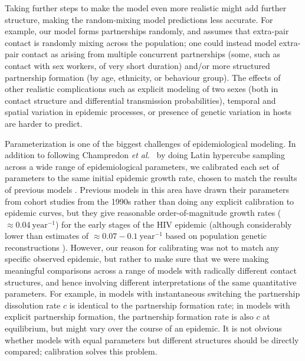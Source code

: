 \documentclass[10pt,letterpaper]{article}
\newcommand{\etal}{\textit{et al.}}
\begin{document}
Taking further steps to make the model even more realistic
might add further structure,
making the random-mixing model predictions less accurate. For
example, our model forms partnerships randomly, and assumes that
extra-pair contact is randomly mixing across the population;
one could instead model extra-pair contact as arising from
multiple concurrent partnerships (some, such as contact with sex
workers, of very short duration) and/or more structured partnership
formation (by age, ethnicity, or behaviour group). The effects of
other realistic complications such as explicit modeling of two
sexes (both in contact structure and differential transmission
probabilities), temporal and spatial variation in epidemic processes,
or presence of genetic variation in hosts are harder to predict.

Parameterization is one of the biggest challenges of epidemiological
modeling. In addition to following Champredon \etal\ \cite{champredon_hiv_2013} 
by doing Latin hypercube
sampling across a wide range of epidemiological parameters, we 
calibrated each set of parameters to the same initial epidemic
growth rate, chosen to match the results of previous models
\cite{shirreff_transmission_2011}.  Previous models 
in this area have drawn their
parameters from cohort studies from the 1990s
\cite{wawer2005rates,hollingsworth_hiv1_2008}
rather than doing any explicit calibration to epidemic curves,
but they give reasonable order-of-magnitude
growth rates ($\approx 0.04~\textrm{year}^{-1}$)
for the early stages of the HIV epidemic (although considerably
lower than estimates of $\approx 0.07-0.1~\textrm{year}^{-1}$
based on population genetic reconstructions \cite{faria_early_2014}).
However, our reason for calibrating was not to match any
specific observed epidemic, but rather to make sure that
we were making meaningful comparisons across a range of
models with radically different contact structures, and
hence involving different interpretations of the same quantitative
parameters.  For example, in models with instantaneous switching the
partnership dissolution rate $c$ is identical to the partnership
formation rate; in models with explicit partnership formation,
the partnership formation rate is also $c$ at equilibrium,
but might vary over the course of an epidemic.
It is not obvious whether models with equal parameters but
different structures should be directly compared; calibration
solves this problem.
\end{document}
